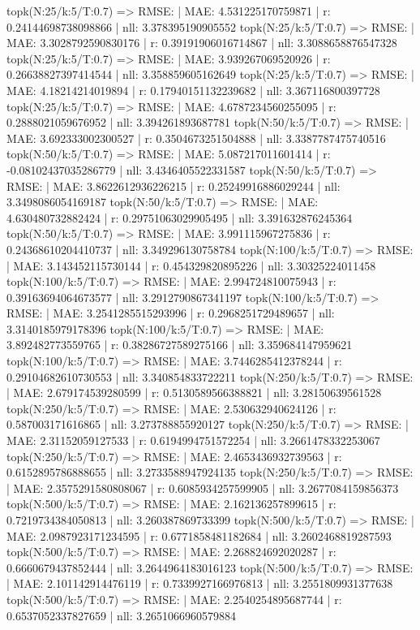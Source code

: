 topk(N:25/k:5/T:0.7) => RMSE: | MAE: 4.531225170759871 | r: 0.24144698738098866 | nll: 3.378395190905552
topk(N:25/k:5/T:0.7) => RMSE: | MAE: 3.3028792590830176 | r: 0.39191906016714867 | nll: 3.3088658876547328
topk(N:25/k:5/T:0.7) => RMSE: | MAE: 3.939267069520926 | r: 0.26638827397414544 | nll: 3.358859605162649
topk(N:25/k:5/T:0.7) => RMSE: | MAE: 4.18214214019894 | r: 0.17940151132239682 | nll: 3.367116800397728
topk(N:25/k:5/T:0.7) => RMSE: | MAE: 4.6787234560255095 | r: 0.2888021059676952 | nll: 3.394261893687781
topk(N:50/k:5/T:0.7) => RMSE: | MAE: 3.692333002300527 | r: 0.3504673251504888 | nll: 3.3387787475740516
topk(N:50/k:5/T:0.7) => RMSE: | MAE: 5.087217011601414 | r: -0.08102437035286779 | nll: 3.4346405522331587
topk(N:50/k:5/T:0.7) => RMSE: | MAE: 3.8622612936226215 | r: 0.25249916886029244 | nll: 3.3498086054169187
topk(N:50/k:5/T:0.7) => RMSE: | MAE: 4.630480732882424 | r: 0.29751063029905495 | nll: 3.391632876245364
topk(N:50/k:5/T:0.7) => RMSE: | MAE: 3.991115967275836 | r: 0.24368610204410737 | nll: 3.349296130758784
topk(N:100/k:5/T:0.7) => RMSE: | MAE: 3.143452115730144 | r: 0.454329820895226 | nll: 3.30325224011458
topk(N:100/k:5/T:0.7) => RMSE: | MAE: 2.994724810075943 | r: 0.39163694064673577 | nll: 3.2912790867341197
topk(N:100/k:5/T:0.7) => RMSE: | MAE: 3.2541285515293996 | r: 0.2968251729489657 | nll: 3.3140185979178396
topk(N:100/k:5/T:0.7) => RMSE: | MAE: 3.892482773559765 | r: 0.38286727589275166 | nll: 3.359684147959621
topk(N:100/k:5/T:0.7) => RMSE: | MAE: 3.7446285412378244 | r: 0.29104682610730553 | nll: 3.340854833722211
topk(N:250/k:5/T:0.7) => RMSE: | MAE: 2.679174539280599 | r: 0.5130589566388821 | nll: 3.28150639561528
topk(N:250/k:5/T:0.7) => RMSE: | MAE: 2.530632940624126 | r: 0.587003171616865 | nll: 3.273788855920127
topk(N:250/k:5/T:0.7) => RMSE: | MAE: 2.31152059127533 | r: 0.6194994751572254 | nll: 3.2661478332253067
topk(N:250/k:5/T:0.7) => RMSE: | MAE: 2.4653436932739563 | r: 0.6152895786888655 | nll: 3.2733588947924135
topk(N:250/k:5/T:0.7) => RMSE: | MAE: 2.3575291580808067 | r: 0.6085934257599905 | nll: 3.2677084159856373
topk(N:500/k:5/T:0.7) => RMSE: | MAE: 2.162136257899615 | r: 0.7219734384050813 | nll: 3.260387869733399
topk(N:500/k:5/T:0.7) => RMSE: | MAE: 2.0987923171234595 | r: 0.6771858481182684 | nll: 3.2602468819287593
topk(N:500/k:5/T:0.7) => RMSE: | MAE: 2.268824692020287 | r: 0.6660679437852444 | nll: 3.2644964183016123
topk(N:500/k:5/T:0.7) => RMSE: | MAE: 2.101142914476119 | r: 0.7339927166976813 | nll: 3.2551809931377638
topk(N:500/k:5/T:0.7) => RMSE: | MAE: 2.2540254895687744 | r: 0.6537052337827659 | nll: 3.2651066960579884
